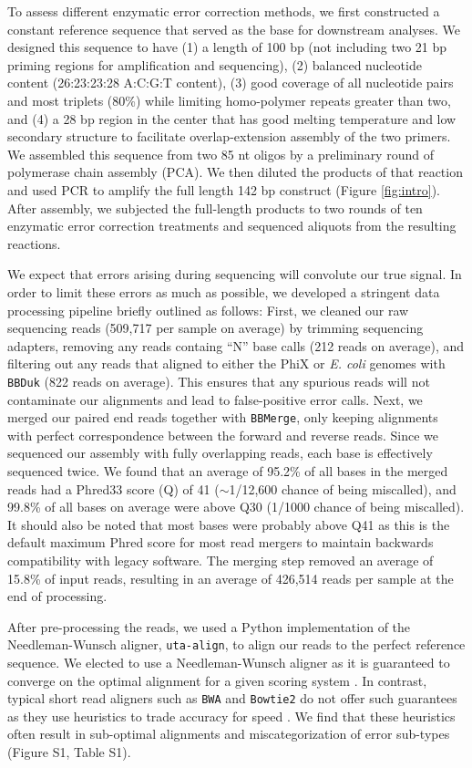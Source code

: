 \documentclass[letterpaper,12pt]{article}
\begin{document}
To assess different enzymatic error correction methods, we first constructed a constant reference sequence that served as the base for downstream analyses. We designed this sequence to have (1) a length of 100 bp (not including two 21 bp priming regions for amplification and sequencing), (2) balanced nucleotide content (26:23:23:28 A:C:G:T content), (3) good coverage of all nucleotide pairs and most triplets (80\%) while limiting homo-polymer repeats greater than two, and (4) a 28 bp region in the center that has good melting temperature and low secondary structure to facilitate overlap-extension assembly of the two primers. We assembled this sequence from two 85 nt oligos by a preliminary round of polymerase chain assembly (PCA). We then diluted the products of that reaction and used PCR to amplify the full length 142 bp construct (Figure \ref{fig:intro}). After assembly, we subjected the full-length products to two rounds of ten enzymatic error correction treatments and sequenced aliquots from the resulting reactions.

We expect that errors arising during sequencing will convolute our true signal. In order to limit these errors as much as possible, we developed a stringent data processing pipeline briefly outlined as follows: First, we cleaned our raw sequencing reads (509,717 per sample on average) by trimming sequencing adapters, removing any reads containg ``N'' base calls (212 reads on average), and filtering out any reads that aligned to either the PhiX or \textit{E. coli} genomes with \texttt{BBDuk} (822 reads on average). This ensures that any spurious reads will not contaminate our alignments and lead to false-positive error calls. Next, we merged our paired end reads together with \texttt{BBMerge}, only keeping alignments with perfect correspondence between the forward and reverse reads. Since we sequenced our assembly with fully overlapping reads, each base is effectively sequenced twice. We found that an average of 95.2\% of all bases in the merged reads had a Phred33 score (Q) of 41 ($\sim$1/12,600 chance of being miscalled), and 99.8\% of all bases on average were above Q30 (1/1000 chance of being miscalled). It should also be noted that most bases were probably above Q41 as this is the default maximum Phred score for most read mergers to maintain backwards compatibility with legacy software. The merging step removed an average of 15.8\% of input reads, resulting in an average of 426,514 reads per sample at the end of processing.

After pre-processing the reads, we used a Python implementation of the Needleman-Wunsch aligner, \texttt{uta-align}, to align our reads to the perfect reference sequence. We elected to use a Needleman-Wunsch aligner as it is guaranteed to converge on the optimal alignment for a given scoring system \cite{needleman1970,altschul1986}. In contrast, typical short read aligners such as \texttt{BWA} and \texttt{Bowtie2} do not offer such guarantees as they use heuristics to trade accuracy for speed \cite{li2010,langmead2012}. We find that these heuristics often result in sub-optimal alignments and miscategorization of error sub-types (Figure S1, Table S1).
\end{document}
